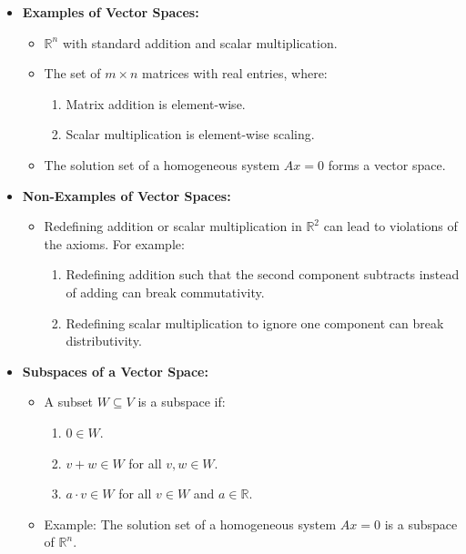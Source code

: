 \documentclass{article}
\begin{document}
\begin{itemize}
  \item \textbf{Examples of Vector Spaces:}
    \begin{itemize}
      \item $\mathbb{R}^n$ with standard addition and scalar multiplication.
      \item The set of $m \times n$ matrices with real entries, where:
        \begin{enumerate}
          \item Matrix addition is element-wise.
          \item Scalar multiplication is element-wise scaling.
        \end{enumerate}
      \item The solution set of a homogeneous system $Ax = 0$ forms a vector space.
    \end{itemize}

  \item \textbf{Non-Examples of Vector Spaces:}
    \begin{itemize}
      \item Redefining addition or scalar multiplication in $\mathbb{R}^2$ can lead to violations of the axioms. For example:
        \begin{enumerate}
          \item Redefining addition such that the second component subtracts instead of adding can break commutativity.
          \item Redefining scalar multiplication to ignore one component can break distributivity.
        \end{enumerate}
    \end{itemize}

  \item \textbf{Subspaces of a Vector Space:}
    \begin{itemize}
      \item A subset $W \subseteq V$ is a subspace if:
        \begin{enumerate}
          \item $0 \in W$.
          \item $v + w \in W$ for all $v, w \in W$.
          \item $a \cdot v \in W$ for all $v \in W$ and $a \in \mathbb{R}$.
        \end{enumerate}
      \item Example: The solution set of a homogeneous system $Ax = 0$ is a subspace of $\mathbb{R}^n$.
    \end{itemize}
\end{itemize}
\end{document}
